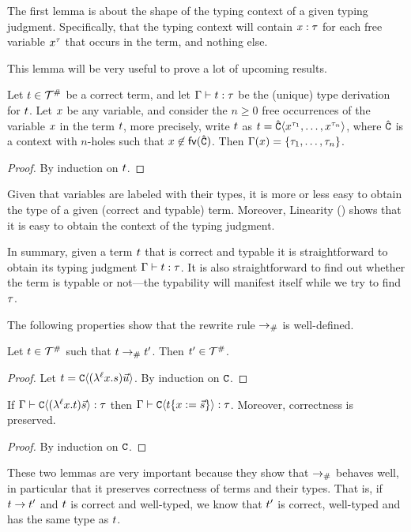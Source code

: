 
The first lemma is about the shape of the typing context of a given typing judgment.
Specifically, that the typing context will contain $x : \tau$ for each free variable
$x^\tau$ that occurs in the term, and nothing else.

This lemma will be very useful to prove a lot of upcoming results.

\begin{lemma}[Linearity]
Let $t \in \mathcal{T}^{\mathtt{\#}}$ be a correct term,
and let $\Gamma \vdash t : \tau$ be the (unique) type derivation for $t$.
Let $x$ be any variable,
and consider the $n \geq 0$ free occurrences of the variable $x$ in the term $t$,
more precisely, write $t$ as $t = \hat{\mathtt{C}}\langle x^{\tau_1},\hdots,x^{\tau_n}\rangle$,
where $\hat{\mathtt{C}}$ is a context with $n$-holes such that $x \not\in \mathsf{fv}({\hat{\mathtt{C}}})$.
Then $\Gamma(x) = \{\tau_1,\hdots,\tau_n\}$.
\end{lemma}
\begin{proof}
By induction on $t$.
\end{proof}


\begin{remark}
  Given that variables are labeled with their types, it is more or less easy to obtain
  the type of a given (correct and typable) term.
  Moreover, Linearity () shows that it is easy to obtain the context of the typing judgment.

  In summary, given a term $t$ that is correct and typable
  it is straightforward to obtain its typing judgment
  $\Gamma \vdash t : \tau$.
  It is also straightforward to find out whether the term is typable or not---the
  typability will manifest itself while we try to find $\tau$.
\end{remark}



The following properties show that the rewrite rule $\mathrel{\to_{\mathtt{\#}}}$ is well-defined.

\begin{lemma}
Let $t \in \mathcal{T}^{\mathtt{\#}}$ such that $t \mathrel{\to_{\mathtt{\#}}} t'$. Then $t' \in \mathcal{T}^{\mathtt{\#}}$.
\end{lemma}
\begin{proof}
Let $t = \mathtt{C}\langle(\lambda^{\ell} x. s) \vec{u}\rangle$. By induction on $\mathtt{C}$.
\end{proof}


\begin{lemma}
If $\Gamma \vdash \mathtt{C}\langle(\lambda^{\ell} x. t) \vec{s}\rangle : \tau$
then $\Gamma \vdash \mathtt{C}\langle t\{x := \vec{s}\}\rangle : \tau$.
Moreover, correctness is preserved.
\end{lemma}
\begin{proof}
 By induction on $\mathtt{C}$.
\end{proof}

These two lemmas are very important because they show that $\mathrel{\to_{\mathtt{\#}}}$ behaves
well, in particular that it preserves correctness of terms and their types.
That is, if $t \to t'$ and $t$ is correct and well-typed,
we know that $t'$ is correct, well-typed and has the same type as $t$.
